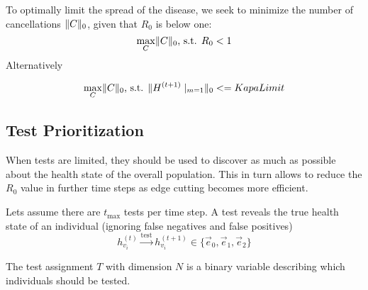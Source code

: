 To optimally limit the spread of the disease, we seek to minimize the number of cancellations $\lVert C\rVert_0$, given that $R_0$ is below one:
\begin{equation}
	\max_{C} \lVert C\rVert_0\text{, s.t. }R_0 < 1
\end{equation}
Alternatively

\begin{equation}
	\max_{C} \lVert C\rVert_0\text{, s.t. } \lVert H^{(t+1)}\mid_{m=1}\rVert_{0} <= KapaLimit
\end{equation}


\subsection{Test Prioritization}
When tests are limited, they should be used to discover as much as possible about the health state of the overall population.
This in turn allows to reduce the $R_0$ value in further time steps as edge cutting becomes more efficient.

Lets assume there are $t_{\text{max}}$ tests per time step.
A test reveals the true health state of an individual (ignoring false negatives and false positives)
\begin{equation}
	h_{{v}_i}^{(t)} \xrightarrow{\text{test}} h_{{v}_i}^{(t+1)} \in \{\vec{e}_0, \vec{e}_1, \vec{e}_2 \}
\end{equation}

The test assignment $T$ with dimension $N$ is a binary variable describing which individuals should be tested.